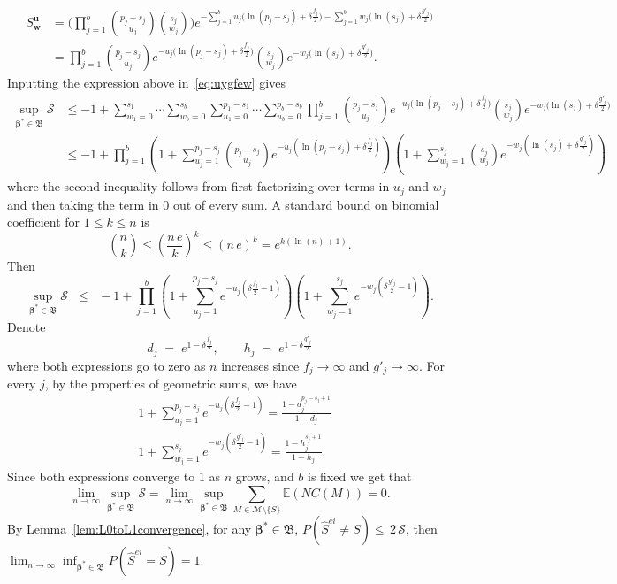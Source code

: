 \documentclass[
  12pt]{article}
\newcommand{\E}{\mathbb{E}}
\newcommand{\M}{\mathcal{M}}
\newcommand{\bu}{\mathbf{u}}
\newcommand{\bw}{\mathbf{w}}
\newcommand{\bbeta}{\boldsymbol{\beta}}
\newcommand{\bB}{\mathfrak{B}}
\begin{document}
\begin{align*}
    S^{\bu}_{\bw}&= \bigg(\prod_{j=1}^b {\binom{p_j-s_j}{u_j}}{\binom{s_j}{w_j}}\bigg)e^{- \sum_{j=1}^b u_j\big(\ln(p_j-s_j)+\delta \tfrac{f_j}{2}\big)-\sum_{j=1}^b w_j\big(\ln(s_j)+\delta \tfrac{g'_j}{2}\big)} \\
    &= \prod_{j=1}^b {\binom{p_j-s_j}{u_j}}e^{- u_j\big(\ln(p_j-s_j)+\delta \tfrac{f_j}{2}\big)}{\binom{s_j}{w_j}}e^{-w_j\big(\ln(s_j)+\delta \tfrac{g'_j}{2}\big)}.
\end{align*}
Inputting the expression above in~\eqref{eq:uygfew} gives
\begin{align*}
    \sup_{\bbeta^*\in \bB} \mathcal{S} 
    &\leq -1+\sum_{w_1=0}^{s_1}\cdots\sum_{w_b=0}^{s_b}\sum_{u_1=0}^{p_1-s_1}\cdots\sum_{u_b=0}^{p_b-s_b}\prod_{j=1}^b {\binom{p_j-s_j}{u_j}}e^{- u_j\big(\ln(p_j-s_j)+\delta \tfrac{f_j}{2}\big)}{\binom{s_j}{w_j}}e^{-w_j\big(\ln(s_j)+\delta \tfrac{g'_j}{2}\big)}\\
    &\leq - 1 + \prod_{j=1}^b\left(1+\sum_{u_j=1}^{p_j-s_j}{\binom{p_j-s_j}{u_j}}e^{- u_j(\ln(p_j-s_j)+\delta \tfrac{f_j}{2})}\right)\left(1+
    \sum_{w_j=1}^{s_j}{\binom{s_j}{w_j}}
    e^{-w_j(\ln(s_j)+\delta \tfrac{g'_j}{2})}\right) 
\end{align*}
where the second inequality follows from first factorizing over terms in $u_j$ and $w_j$ and then taking the term in 0 out of every sum. A standard bound on binomial coefficient for $1\leq k\leq n$ is
\begin{equation}\label{eq:upperboudbinom}
    \binom{n}{k} \leq \left(\frac{n\,e}{k}\right)^k \leq \left(n\,e\right)^k = e^{k(\ln(n)+1)}.
\end{equation}
Then
\begin{equation}\label{eq:upperbound_sumprob}
    \sup_{\bbeta^*\in \bB} \mathcal{S} \;\;\leq\;\; - 1+\prod_{j=1}^b\left(1+\sum_{u_j=1}^{p_j-s_j}e^{-u_j\left(\delta \tfrac{f_j}{2}-1\right)}\right)\left(1+
    \sum_{w_j=1}^{s_j}    e^{-w_j\left(\delta \tfrac{g'_j}{2}-1\right)}\right).
\end{equation}
Denote
$$
d_j\;=\;e^{1-\delta \tfrac{f_j}{2}},\qquad h_j\;=\;e^{1-\delta \tfrac{g'_j}{2}}
$$
where both expressions go to zero as $n$ increases since $f_j\to\infty$ and $g'_j\to\infty$.
For every $j$, by the properties of geometric sums, we have
\begin{align*}
    &1+\sum_{u_j=1}^{p_j-s_j}e^{-u_j\left(\delta \tfrac{f_j}{2}-1\right)}
    =\frac{1-d_j^{p_j-s_j+1}}{1-d_j} \\
    &1+\sum_{w_j=1}^{s_j}    e^{-w_j\left(\delta \tfrac{g'_j}{2}-1\right)} =\frac{1-h_j^{s_j+1}}{1-h_j}.
\end{align*}
Since both expressions converge to $1$ as $n$ grows, and $b$ is fixed we get that
\begin{equation}\label{eq:NPFENK}
\lim_{n \to \infty} \sup_{\bbeta^*\in \bB} \mathcal{S}=\lim_{n \to \infty} \sup_{\bbeta^*\in \bB}\sum_{M \in \M\setminus \{S\}}\E\left(NC(M)\right)= 0.
\end{equation}
By Lemma~\ref{lem:L0toL1convergence}, for any $\bbeta^*\in \bB$, $P(\hat{S}^{ei}\neq S)\leq \,2\, \mathcal{S}$, then $\lim_{n \to \infty} \inf_{\bbeta^*\in \bB}P(\hat{S}^{ei}= S)=1$.
\end{document}
